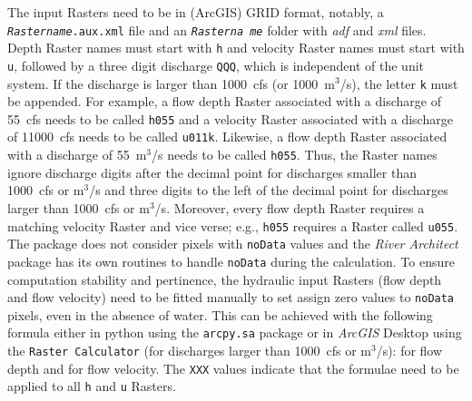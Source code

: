 The input Rasters need to be in (ArcGIS) GRID format, notably, a \texttt{\textit{Raster{\myUnderscore}name}.aux.xml} file and an \texttt{\textit{Raster{\myUnderscore}na me}} folder with \textit{adf} and \textit{xml} files.
Depth Raster names must start with \texttt{h} and velocity Raster names must start with \texttt{u}, followed by a three digit discharge \texttt{QQQ}, which is independent of the unit system. If the discharge is larger than 1000~cfs (or 1000~m$^3$/s), the letter \texttt{k} must be appended. For example, a flow depth Raster associated with a discharge of 55~cfs needs to be called \texttt{h055} and a velocity Raster associated with a discharge of 11000~cfs needs to be called \texttt{u011k}. Likewise, a flow depth Raster associated with a discharge of 55~m$^3$/s needs to be called \texttt{h055}. Thus, the Raster names ignore discharge digits after the decimal point for discharges smaller than 1000~cfs or m$^3$/s and three digits to the left of the decimal point for discharges larger than 1000~cfs or m$^3$/s. Moreover, every flow depth Raster requires a matching velocity Raster and vice verse; e.g., \texttt{h055} requires a Raster called \texttt{u055}.\\

The  package does not consider pixels with \texttt{noData} values and the \textit{River Architect} package has its own routines to handle \texttt{noData} during the calculation. To ensure computation stability and pertinence, the hydraulic input Rasters (flow depth and flow velocity) need to be fitted manually to set assign zero values to \texttt{noData} pixels, even in the absence of water. This can be achieved with the following formula either in python using the \texttt{arcpy.sa} package or in \textit{ArcGIS} Desktop using the \texttt{Raster Calculator} (for discharges larger than 1000~cfs or m$^3$/s):  for flow depth and  for flow velocity. The \texttt{XXX} values indicate that the formulae need to be applied to all \texttt{h} and \texttt{u} Rasters.\\

